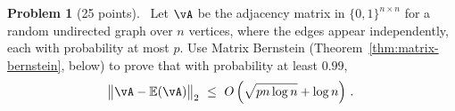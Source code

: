 \documentclass[11pt]{article}
\newcommand{\E}{\ensuremath{\mathbb{E}}} %
\theoremstyle{definition}
\newtheorem{problem}{Problem}
\begin{document}
\newpage


\begin{problem}[25 points] \
  Let $\vA$ be the adjacency matrix in $\{0,1\}^{n \times n}$ for a random
  undirected graph over $n$ vertices, where the edges appear independently, each
  with probability at most $p$.
  Use Matrix Bernstein (Theorem~\ref{thm:matrix-bernstein}, below) to prove that
  with probability at least $0.99$,
  \begin{equation*}
    \norm{\vA - \E(\vA)}_2
    \ \leq \
    O\del{ \sqrt{pn\log n} + \log n }
    \,.
  \end{equation*}

\end{problem}
\end{document}
